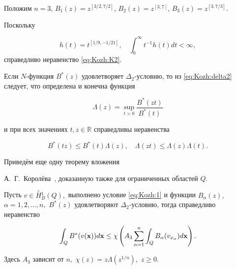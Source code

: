 \begin{example}[2]Положим $n=3$, $B_1(z)=z^{[{3}/{2}, {7}/{2}]}$, $B_2(z)=z^{[3, 7]}$, $B_3(z)=z^{[3, {7}/{3}]}$.

Поскольку

$$h(t)=t^{[{1}/{9},- {1}/{21}]},\quad \int_0^\infty t^{-1}{h(t)}dt<\infty,$$ справедливо неравенство \eqref{eq:Kozh:K2}.

\end{example}



\smallskip



Если $N$-функция $B^*(z)$ удовлетворяет $\Delta_2$-условию, то из \eqref{eq:Kozh:delta2} следует, что определена и конечна функция

$$

\Lambda(z)=\sup\limits_{t>0}\frac{B^*(zt)}{B^*(t)}

$$

и при всех значениях $t,z\in \mathbb{R}$ справедливы  неравенства

$$B^*(tz)\leq B^*(t)\Lambda(z),\quad \Lambda(zt)\leq \Lambda(z)\Lambda(t).$$

Приведём еще одну теорему вложения

 А.~Г.~Королёва~\cite{KozhKhad:bib:Korolev2}, доказанную также для ограниченных областей $Q$.



\smallskip

\hypertarget{kozh:lemma3}{}

\begin{lemma}[3]Пусть $v\in \stackrel {\circ}

{H}{}_{B}^1(Q),$ выполнено условие \eqref{eq:Kozh:1} и функции $B_{\alpha}(z),$ $\alpha=1, 2,\ldots,n,$ $B^*(z)$ удовлетворяют $\Delta_2$-условию,  тогда справедливо неравенство

\begin{equation}\label{eq:Kozh:K3}

\int_{Q}B^*(v({\bf x}))d{\bf x}\leq \chi\left(A_3\sum_{\alpha=1}^n \int_{Q}B_{\alpha}(v_{x_{\alpha}})d{\bf x}\right).

\end{equation}

Здесь $A_3$ зависит от $n,$ $\chi(z)=z\Lambda(z^{1/n}),$ $z\geq 0.$

\end{lemma}



\smallskip





